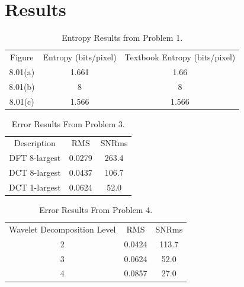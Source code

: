 \documentclass[./rarnold_project6.tex]{subfiles}
\begin{document}
\clearpage

\section*{Results}
	
\begin{table}[htbp]
\centering
\caption{Entropy Results from Problem 1.}
\label{part1}
\begin{tabular}{|c|c|c|}
\hline
Figure & Entropy (bits/pixel)& Textbook Entropy (bits/pixel)\\ \hhline{|=|=|=|}
8.01(a)& 1.661 & 1.66\\ \hline
8.01(b)& 8 & 8\\ \hline
8.01(c)& 1.566 & 1.566\\ \hline
\end{tabular}
\end{table}	

\begin{table}[htbp]
\centering
\caption{Error Results From Problem 3.}
\label{part3}
\begin{tabular}{|c|c|c|}
\hline
Description & RMS & SNRms\\ \hhline{|=|=|=|}
DFT 8-largest& 0.0279 & 263.4\\ \hline
DCT 8-largest& 0.0437 & 106.7\\ \hline
DCT 1-largest& 0.0624 & 52.0 \\ \hline
\end{tabular}
\end{table}	

\begin{table}[htbp]
\centering
\caption{Error Results From Problem 4.}
\label{part4}
\begin{tabular}{|c|c|c|}
\hline
Wavelet Decomposition Level & RMS & SNRms\\ \hhline{|=|=|=|}
2& 0.0424 & 113.7\\ \hline
3& 0.0624 & 52.0\\ \hline
4& 0.0857 & 27.0 \\ \hline
\end{tabular}
\end{table}	

\clearpage
\end{document}
